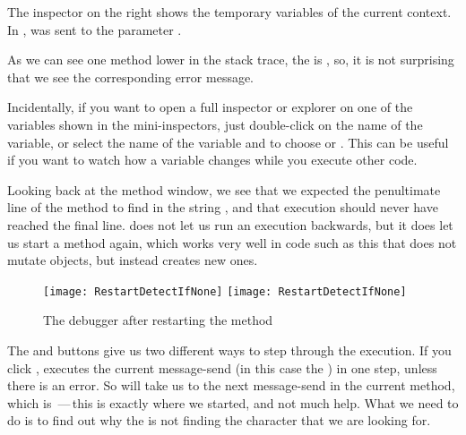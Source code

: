 \documentclass[a4paper,10pt,twoside]{book}
\begin{document}
The inspector on the right shows the temporary variables of the current context.
In ,
 was sent to the parameter .


As we can see one method lower in the stack trace, the  is , so, it is not surprising that we see the corresponding error message.

Incidentally, if you want to open a full inspector or explorer on one of the variables shown in the mini-inspectors, just double-click on the name of the variable, or select the name of the variable and \actclick to choose  or .
This can be useful if you want to watch how a variable changes while you execute other code. 

Looking back at the method window, we see that we expected the penultimate line of the method to find  in the string , and that execution should never have reached the final line.
\pharo does not let us run an execution backwards, but it does let us start a method again, which works very well in code such as this that does not mutate objects, but instead creates new ones.  


\begin{figure}[btp]
	\begin{center}
	\ifluluelse
		{\texttt{[image: RestartDetectIfNone]}}
		{\texttt{[image: RestartDetectIfNone]}}
	\end{center}
	\caption{The debugger after restarting the  method}
\end{figure}

The  and  buttons give us two different ways to step through the execution.  If you click , \pharo executes the current message-send (in this case the ) in one step, unless there is an error.  
So  will take us to the next message-send in the current method, which is \,---\,this is exactly where we started, and not much help. 
What we need to do is to find out why the  is not finding the character that we are looking for.
\end{document}
